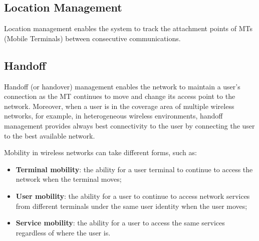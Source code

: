 \subsection*{Location Management}
 Location management enables the system to track the attachment points of MTs (Mobile Terminals) between consecutive communications. 


\subsection*{Handoff}
Handoff (or handover) management enables the network to maintain a user’s connection as the MT continues to move and change its access point to the network. Moreover, when a user is in the coverage area of multiple wireless networks, for example, in heterogeneous wireless environments, handoff management provides always best connectivity to the user by connecting the user to the best available network. \par


\noindent Mobility in wireless networks can take different forms, such as:
\begin{itemize}
\item \textbf{Terminal mobility}: the ability for a user terminal to continue to access the network when the terminal moves;
\item \textbf{User mobility}: the ability for a user to continue to access network services from different terminals under the same user identity when the user moves;
\item \textbf{Service mobility}: the ability for a user to access the same services regardless of where the user is.
\end{itemize}

\newpage\thispagestyle{empty}